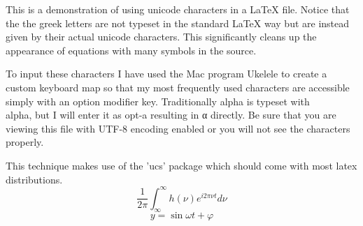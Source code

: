 \documentclass[11pt]{article}
\begin{document}
This is a demonstration of using unicode characters in a LaTeX file.  Notice that the the greek letters are not typeset in the standard LaTeX way but are instead given by their actual unicode characters.  This significantly cleans up the appearance of equations with many symbols in the source.

To input these characters I have used the Mac program Ukelele to create a custom keyboard map so that my most frequently used characters are accessible simply with an option modifier key.  Traditionally alpha is typeset with \\alpha, but I will enter it as opt-a resulting in α directly.  Be sure that you are viewing this file with UTF-8 encoding enabled or you will not see the characters properly.

This technique makes use of the 'ucs' package which should come with most latex distributions.
$$\frac{1}{2 π} \int_{∞}^{∞} h(ν)e^{i 2 π ν t}dν$$
$$y = \sin{ω t + φ}$$
\end{document}
